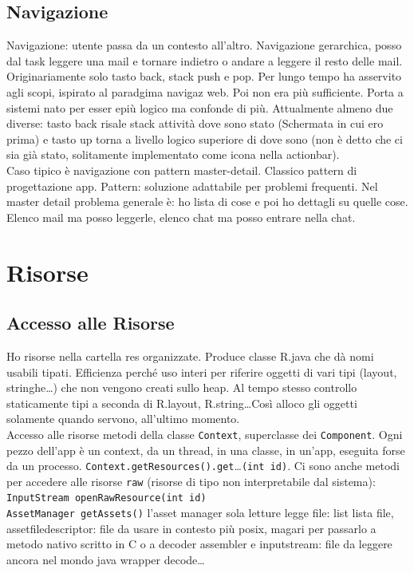 \documentclass[10pt]{book}
\begin{document}
\section{Navigazione}
Navigazione: utente passa da un contesto all'altro. Navigazione gerarchica, posso dal task leggere una mail e tornare indietro o andare a leggere il resto delle mail.\\
Originariamente solo tasto back, stack push e pop. Per lungo tempo ha asservito agli scopi, ispirato al paradgima navigaz web. Poi non era più sufficiente. Porta a sistemi nato per esser epiù logico ma confonde di più. Attualmente almeno due diverse: tasto back risale stack attività dove sono stato (Schermata in cui ero prima) e tasto up torna a livello logico superiore di dove  sono (non è detto che ci sia già stato, solitamente implementato come icona nella actionbar).\\
Caso tipico è navigazione con pattern master-detail. Classico pattern di progettazione app. Pattern: soluzione adattabile per problemi frequenti. Nel master detail problema generale è: ho lista di cose e poi ho dettagli su quelle cose. Elenco mail ma posso leggerle, elenco chat ma posso entrare nella chat.
\chapter{Risorse}
\section{Accesso alle Risorse}
Ho risorse nella cartella res organizzate. Produce classe R.java che dà nomi usabili tipati. Efficienza perché uso interi per riferire oggetti di vari tipi (layout, stringhe\ldots) che non vengono creati sullo heap. Al tempo stesso controllo staticamente tipi a seconda di R.layout, R.string\ldots Così alloco gli oggetti solamente quando servono, all'ultimo momento.\\
Accesso alle risorse metodi della classe \texttt{Context}, superclasse dei \texttt{Component}. Ogni pezzo dell'app è un context, da un thread, in una classe, in un'app, eseguita forse da un processo. \texttt{Context.getResources().get}\ldots\texttt{(int id)}. Ci sono anche metodi per accedere alle risorse \texttt{raw} (risorse di tipo non interpretabile dal sistema): \texttt{InputStream openRawResource(int id)}\\
\texttt{AssetManager getAssets()} l'asset manager sola letture legge file: list lista file, assetfiledescriptor: file da usare in contesto più posix, magari per passarlo a metodo nativo scritto in C o a decoder assembler e inputstream: file da leggere ancora nel mondo java wrapper decode\ldots\\
\end{document}
